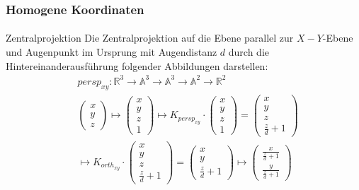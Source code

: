 \documentclass{beamer}
\begin{document}
\begin{frame}
    \frametitle{Homogene Koordinaten}
\framesubtitle{}
\begin{block}{Zentralprojektion}
Die Zentralprojektion auf die Ebene parallel zur $X-Y$-Ebene und Augenpunkt im Ursprung mit Augendistanz $d$ durch die Hintereinanderausführung folgender Abbildungen darstellen:
\begin{align*}
& persp_{xy} :\mathbb{R}^3   \to \mathbb{A}^3    \to  \mathbb{A}^3    \to \mathbb{A}^2    \to \mathbb{R}^2  \\
&\begin{pmatrix} x \\ y \\ z \end{pmatrix} \mapsto \begin{pmatrix} x \\ y \\ z \\ 1 \end{pmatrix}   \mapsto K_{persp_{xy}} \cdot  \begin{pmatrix} x \\ y \\ z \\ 1 \end{pmatrix} =   \begin{pmatrix} x \\ y \\ z \\ \frac{z}{d} + 1 \end{pmatrix} \\
 & \mapsto K_{orth_{xy}} \cdot   \begin{pmatrix} x \\ y \\ z \\ \frac{z}{d} + 1 \end{pmatrix}=   \begin{pmatrix} x \\ y \\ \frac{z}{d} + 1 \end{pmatrix}   \mapsto 
 \begin{pmatrix}  \frac{x}{\frac{z}{d} +1 } \\   \frac{y}{\frac{z}{d} +1 } \end{pmatrix}
 \end{align*}

\end{block}
\end{frame}
\end{document}
